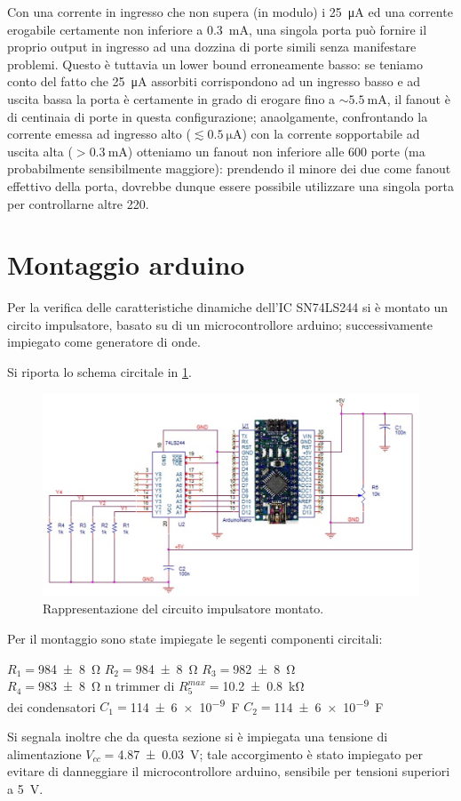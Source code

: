 	Con una corrente in ingresso che non supera (in modulo) i \SI{25}{\uA} ed
	una corrente erogabile certamente non inferiore a \SI{0.3}{\mA},
	una singola porta può fornire il proprio output in ingresso ad una dozzina
	di porte simili senza manifestare problemi. Questo è tuttavia un lower bound
	erroneamente basso: se teniamo conto del fatto che \SI{25}{\uA} assorbiti
	corrispondono ad un ingresso basso e ad uscita bassa la porta è certamente
	in grado di	erogare fino a $\sim \SI{5.5}{\mA}$, il fanout è di centinaia
	di porte in questa configurazione; anaolgamente, confrontando la corrente
	emessa ad ingresso alto ($\lesssim \SI{0.5}{\micro \ampere}$) con la
	corrente sopportabile ad uscita alta ($ > \SI{0.3}{\mA}$) otteniamo un
	fanout non inferiore alle 600 porte (ma probabilmente sensibilmente
	maggiore): prendendo il minore dei due come fanout effettivo della porta,
	dovrebbe dunque essere possibile utilizzare una singola porta per
	controllarne altre 220.


\section{Montaggio arduino}
Per la verifica delle caratteristiche dinamiche dell'IC SN74LS244 si è montato un circito impulsatore, basato su di un microcontrollore arduino; successivamente impiegato come generatore di onde. 

Si riporta lo schema circitale in \figurename{ \ref{f:impulsatore}}. 

\begin{figure}[htb]
	\includegraphics[scale=0.50]{../Figs-Tabs/imp.png}
	\caption{Rappresentazione del circuito impulsatore montato.}
	\label{f:impulsatore}
\end{figure}
Per il montaggio sono state impiegate le  segenti componenti circitali:
\begin{center}
	\bigskip
	$R_{1}=$\SI{984 \pm 8}{\ohm} $R_{2}=$\SI{984 \pm 8}{\ohm} $R_{3}=$\SI{982 \pm 8}{\ohm} \\
	$R_{4}=$\SI{983 \pm 8}{\ohm} n trimmer di $R_{5}^{max}=$\SI{10.2 \pm 0.8}{\kilo \ohm} \\
	dei condensatori	$C_{1}=$\SI{114 \pm 6 e-9}{\farad} $C_{2}=$\SI{114  \pm 6 e-9}{\farad}
	
\end{center}
Si segnala inoltre 
che da questa sezione si è impiegata una tensione di alimentazione $V_{cc}=$\SI{4.87 \pm 0.03}{\volt}; tale accorgimento è stato impiegato per evitare di danneggiare il microcontrollore arduino, sensibile per tensioni superiori a \SI{5}{\volt}.

